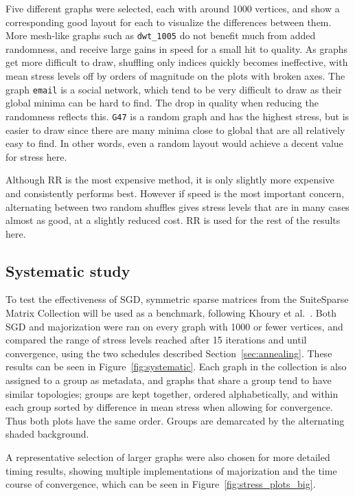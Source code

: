 Five different graphs were selected, each with around 1000 vertices, and show a corresponding good layout for each to visualize the differences between them.
More mesh-like graphs such as \texttt{dwt\_1005} do not benefit much from added randomness, and receive large gains in speed for a small hit to quality.
As graphs get more difficult to draw, shuffling only indices quickly becomes ineffective, with mean stress levels off by orders of magnitude on the plots with broken axes.
The graph \texttt{email} is a social network, which tend to be very difficult to draw as their global minima can be hard to find. The drop in quality when reducing the randomness reflects this. \texttt{G47} is a random graph and has the highest stress, but is easier to draw since there are many minima close to global that are all relatively easy to find. In other words, even a random layout would achieve a decent value for stress here.

Although RR is the most expensive method, it is only slightly more expensive and consistently performs best. However if speed is the most important concern, alternating between two random shuffles gives stress levels that are in many cases almost as good, at a slightly reduced cost.
RR is used for the rest of the results here.

\subsection{Systematic study}
\label{sec:sgd_experiment}
To test the effectiveness of SGD, symmetric sparse matrices from the SuiteSparse Matrix Collection \cite{Davis2011} will be used as a benchmark, following Khoury et al.\ \cite{Khoury2012}.
Both SGD and majorization were ran on every graph with 1000 or fewer vertices, and compared the range of stress levels reached after 15 iterations and until convergence, using the two schedules described Section~\ref{sec:annealing}. These results can be seen in Figure~\ref{fig:systematic}.
Each graph in the collection is also assigned to a group as metadata, and graphs that share a group tend to have similar topologies; groups are kept together, ordered alphabetically, and within each group sorted by difference in mean stress when allowing for convergence. Thus both plots have the same order. Groups are demarcated by the alternating shaded background. 

A representative selection of larger graphs were also chosen for more detailed timing results, showing multiple implementations of majorization and the time course of convergence, which can be seen in Figure~\ref{fig:stress_plots_big}.

